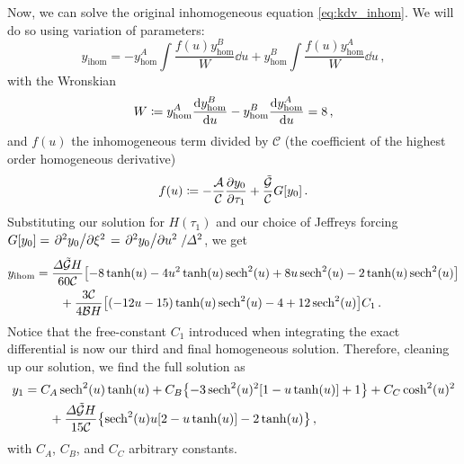 \documentclass{jfm}
\begin{document}
Now, we can solve the original inhomogeneous equation
\cref{eq:kdv_inhom}.
We will do so using variation of parameters:
\begin{equation}
  y_{\text{ihom}} =
  -y^A_{\text{hom}} \int \frac{f(u) y^B_{\text{hom}}}{W} \dd{u}
  +y^B_{\text{hom}} \int \frac{f(u) y^A_{\text{hom}}}{W} \dd{u} \,,
\end{equation}
with the Wronskian
\begin{equation}
  W \coloneqq
    y^A_{\text{hom}} \dv{y^B_{\text{hom}}}{u}
    -y^B_{\text{hom}} \dv{y^A_{\text{hom}}}{u}
    = 8 \,,
\end{equation}
and $f(u)$ the inhomogeneous term divided by $\mathcal{C}$ (the
coefficient of the highest order homogeneous derivative)
\begin{equation}
  f(u) \coloneqq -\frac{\mathcal{A}}{\mathcal{C}} \pdv{y_0}{\tau_1}
    + \frac{\mathcal{\tilde{G}}}{\mathcal{C}} G[y_0] \,.
\end{equation}
Substituting our solution for $H(\tau_1)$ and our choice of Jeffreys
forcing $G[y_0] = \pdv*[2]{y_0}{\xi} = \pdv*[2]{y_0}{u}/\varDelta^2$, we
get
\begin{equation}
  \begin{split}
  y_{\text{ihom}} &=
  \frac{\Delta \mathcal{\tilde{G}} H}{60 \mathcal{C}}
  \bqty{-8\tanh(u)- 4 u^2 \tanh(u)\sech^2(u) +8 u
  \sech^2(u)-2\tanh(u)\sech^2(u)} \\
  &\qquad
  +\frac{3 \mathcal{C}}{4 \mathcal{B} H}
  \bqty{(-12u -15)\tanh(u)\sech^2(u) -4 +12\sech^2(u)} C_1 \,.
\end{split}
\end{equation}
Notice that the free-constant $C_1$ introduced when integrating the exact
differential is now our third and final homogeneous solution.
Therefore, cleaning up our solution, we find the full solution as
\begin{equation}
  \begin{split}
  y_1 &=
  C_A \sech^2(u) \tanh(u)
  +C_B \Bqty{-3\sech^2(u)^2 \bqty{1-u \tanh(u)}+1}
  +C_C \cosh^2(u)^2
  \\
  &\qquad
  + \frac{\Delta \mathcal{\tilde{G}} H}{15 \mathcal{C}}
  \Bqty{\sech^2(u) u \bqty{2-u\tanh(u)}-2\tanh(u)} \,,
  \end{split}
\end{equation}
with $C_A$, $C_B$, and $C_C$ arbitrary constants.
\end{document}
